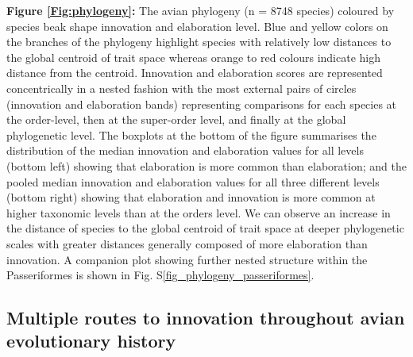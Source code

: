 \documentclass[12pt,letterpaper]{article}
\begin{document}
\noindent \textbf{Figure \ref{Fig:phylogeny}:} The avian phylogeny (n = 8748 species) coloured by species beak shape innovation and elaboration level.
Blue and yellow colors on the branches of the phylogeny highlight species with relatively low distances to the global centroid of trait space whereas orange to red colours indicate high distance from the centroid.
Innovation and elaboration scores are represented concentrically in a nested fashion with the most external pairs of circles (innovation and elaboration bands) representing comparisons for each species at the order-level, then at the super-order level, and finally at the global phylogenetic level.
The boxplots at the bottom of the figure summarises the distribution of the median innovation and elaboration values for all levels (bottom left) showing that elaboration is more common than elaboration;
and the pooled median innovation and elaboration values for all three different levels (bottom right) showing that elaboration and innovation is more common at higher taxonomic levels than at the orders level.
We can observe an increase in the distance of species to the global centroid of trait space at deeper phylogenetic scales with greater distances generally composed of more elaboration than innovation.
A companion plot showing further nested structure within the Passeriformes is shown in Fig. S\ref{fig_phylogeny_passeriformes}. 

\subsection{Multiple routes to innovation throughout avian evolutionary history}
\end{document}
